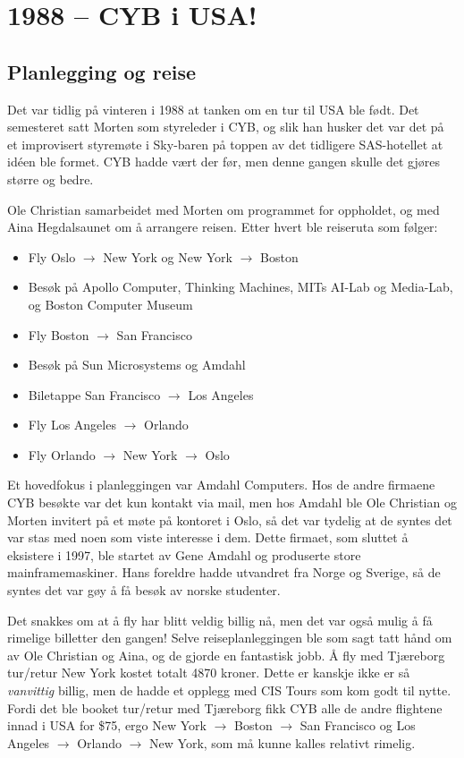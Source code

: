 \chapter{1988 -- CYB i USA!}

\author{Av Morten Moen \& Ole Christian Lingjærde}

\section{Planlegging og reise}

Det var tidlig på vinteren i 1988 at tanken om en tur til USA ble født. Det semesteret satt Morten som styreleder i CYB, og slik han husker det var det på et improvisert styremøte i Sky-baren på toppen av det tidligere SAS-hotellet at idéen ble formet. CYB hadde vært der før, men denne gangen skulle det gjøres større og bedre.

Ole Christian samarbeidet med Morten om programmet for oppholdet, og med Aina Hegdalsaunet om å arrangere reisen. Etter hvert ble reiseruta som følger:

\begin{itemize}
	\item Fly Oslo $\to$ New York og New York $\to$ Boston
	\item Besøk på Apollo Computer, Thinking Machines, MITs AI-Lab og Media-Lab, og Boston Computer Museum
	\item Fly Boston $\to$ San Francisco
	\item Besøk på Sun Microsystems og Amdahl
	\item Biletappe San Francisco $\to$ Los Angeles
	\item Fly Los Angeles $\to$ Orlando
	\item Fly Orlando $\to$ New York $\to$ Oslo
\end{itemize}

Et hovedfokus i planleggingen var Amdahl Computers. Hos de andre firmaene CYB besøkte var det kun kontakt via mail, men hos Amdahl ble Ole Christian og Morten invitert på et møte på kontoret i Oslo, så det var tydelig at de syntes det var stas med noen som viste interesse i dem. Dette firmaet, som sluttet å eksistere i 1997, ble startet av Gene Amdahl og produserte store mainframemaskiner. Hans foreldre hadde utvandret fra Norge og Sverige, så de syntes det var gøy å få besøk av norske studenter.

Det snakkes om at å fly har blitt veldig billig nå, men det var også mulig å få rimelige billetter den gangen! Selve reiseplanleggingen ble som sagt tatt hånd om av Ole Christian og Aina, og de gjorde en fantastisk jobb. Å fly med Tjæreborg tur/retur New York kostet totalt 4870 kroner. Dette er kanskje ikke er så \textit{vanvittig} billig, men de hadde et opplegg med CIS Tours som kom godt til nytte. Fordi det ble booket tur/retur med Tjæreborg fikk CYB alle de andre flightene innad i USA for \$75, ergo New York $\to$ Boston $\to$ San Francisco og Los Angeles $\to$ Orlando $\to$ New York, som må kunne kalles relativt rimelig.

